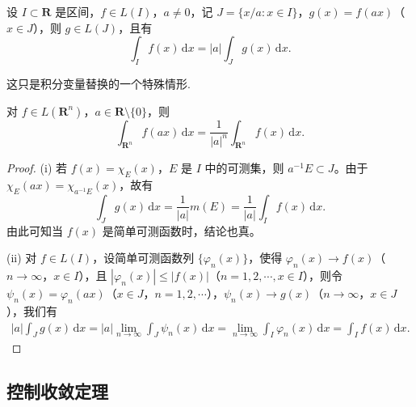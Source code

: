 \documentclass[../../main.tex]{subfiles}
\begin{document}
\begin{proposition}
设 $I \subset \mathbf{R}$ 是区间，$f \in L(I)$，$a \neq 0$，记 $J = \{ x / a : x \in I \}$，$g(x) = f(ax)$（$x \in J$），则 $g \in L(J)$，且有
\[
\int_I f(x) \, \mathrm{d}x = |a| \int_J g(x) \, \mathrm{d}x.
\]

\end{proposition}
\begin{remark}
这只是积分变量替换的一个特殊情形.
\end{remark}
\begin{note}
对 $f \in L(\mathbf{R}^n)$，$a \in \mathbf{R} \setminus \{ 0 \}$，则
\[
\int_{\mathbf{R}^n} f(ax) \, \mathrm{d}x = \frac{1}{|a|^n} \int_{\mathbf{R}^n} f(x) \, \mathrm{d}x.
\]
\end{note}
\begin{proof}
(i) 若 $f(x) = \chi_E(x)$，$E$ 是 $I$ 中的可测集，则 $a^{-1}E \subset J$。由于 $\chi_E(ax) = \chi_{a^{-1}E}(x)$，故有
\[
\int_J g(x) \, \mathrm{d}x = \frac{1}{|a|} m(E) = \frac{1}{|a|} \int_I f(x) \, \mathrm{d}x.
\]
由此可知当 $f(x)$ 是简单可测函数时，结论也真。

(ii) 对 $f \in L(I)$，设简单可测函数列 $\{ \varphi_n(x) \}$，使得 $\varphi_n(x) \to f(x)$（$n \to \infty$，$x \in I$），且 $|\varphi_n(x)| \leqslant |f(x)|$（$n = 1, 2, \cdots, x \in I$），则令 $\psi_n(x) = \varphi_n(ax)$（$x \in J$，$n = 1, 2, \cdots$），$\psi_n(x) \to g(x)$（$n \to \infty$，$x \in J$），我们有
\begin{align*}
|a| \int_J g(x) \, \mathrm{d}x = |a| \lim_{n \to \infty} \int_J \psi_n(x) \, \mathrm{d}x = \lim_{n \to \infty} \int_I \varphi_n(x) \, \mathrm{d}x = \int_I f(x) \, \mathrm{d}x.
\end{align*}
\end{proof}



\subsection{控制收敛定理}
\end{document}
